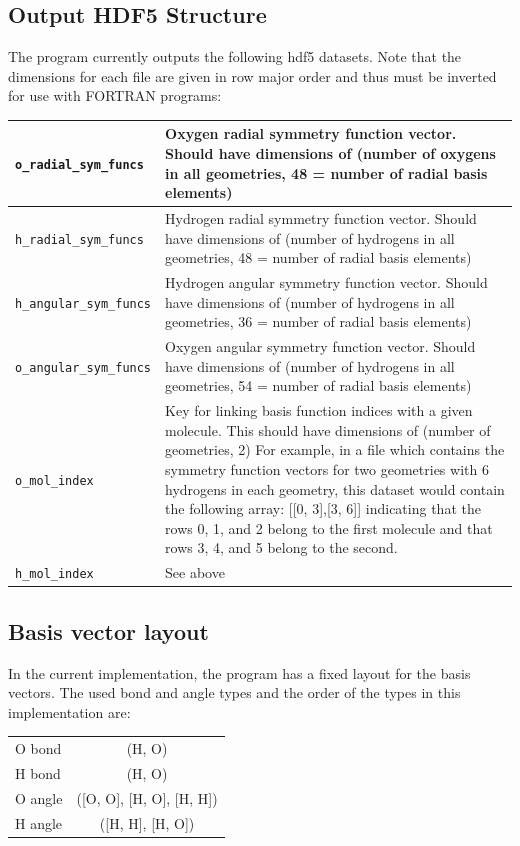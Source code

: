 \documentclass{article}
\begin{document}
\subsection{Output HDF5 Structure}
The program currently outputs the following hdf5 datasets. Note that the dimensions for each file are given in row major order and thus must be inverted for use with FORTRAN programs:

\begin{tabular}{|l | p{7.0cm} |}
\hline
\texttt{o\_radial\_sym\_funcs} & Oxygen radial symmetry function vector. Should have dimensions of (number of oxygens in all geometries, 48 = number of radial basis elements) \\ \hline
\texttt{h\_radial\_sym\_funcs} & Hydrogen radial symmetry function vector. Should have dimensions of (number of hydrogens in all geometries, 48 = number of radial basis elements) \\ \hline
\texttt{h\_angular\_sym\_funcs} & Hydrogen angular symmetry function vector. Should have dimensions of (number of hydrogens in all geometries, 36 = number of radial basis elements) \\ \hline
\texttt{o\_angular\_sym\_funcs} & Oxygen angular symmetry function vector. Should have dimensions of (number of hydrogens in all geometries, 54 = number of radial basis elements) \\ \hline
\texttt{o\_mol\_index} & Key for linking basis function indices with a given molecule. This should have dimensions of (number of geometries, 2) For example, in a file which contains the symmetry function vectors for two geometries with 6 hydrogens in each geometry, this dataset would contain the following array: [[0, 3],[3, 6]] indicating that the rows 0, 1, and 2 belong to the first molecule and that rows 3, 4, and 5 belong to the second. \\ \hline
\texttt{h\_mol\_index} & See above \\
\hline
\end{tabular}

\subsection{Basis vector layout}
In the current implementation, the program has a fixed layout for the basis vectors. The used bond and angle types and the order of the types in this implementation are:

\begin{center}
\begin{tabular}{| l | c |}
\hline
O bond & (H, O) \\
H bond & (H, O) \\
O angle & ([O, O], [H, O], [H, H]) \\
H angle & ([H, H], [H, O])\\
\hline
\end{tabular} 
\end{center}
\end{document}
